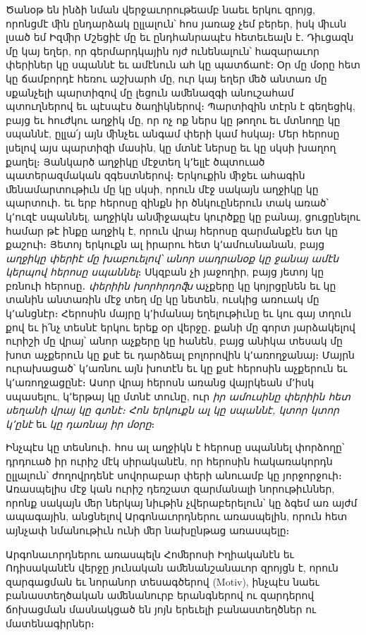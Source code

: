 \documentclass{article}
\begin{document}
{Ծանօթ են ինձի նման վերջաւորութեամբ նաեւ երկու զրոյց, որոնցմէ ﬕն ընդարձակ ըլլալուն՝ հոս յառաջ չեմ բերեր, իսկ ﬕւսն լսած եմ Իզﬕր Մշեցիէ մը եւ ընդհանրապէս հետեւեալն է․ Դիւցազն մը կայ եղեր, որ գերմարդկային ոյժ ունենալուն՝ հազարաւոր փերիներ կը սպաննէ եւ ամէնուն ահ կը պատճաոէ։ Օր մը մօրը հետ կը ճամբորդէ հեռու աշխարհ մը, ուր կայ եղեր ﬔծ անտառ մը սքանչելի պարտիզով մը լեցուն աﬔնազգի անուշահամ պտուղներով եւ պէսպէս ծաղիկներով։ Պարտիզին տէրն է գեղեցիկ, բայց եւ հուժկու աղջիկ մը, որ ոչ ոք ներս կը թողու եւ մտնողը կը սպաննէ, ըլլա՛յ այն ﬕնչեւ անգամ փերի կամ հսկայ։ Մեր հերոսը լսելով այս պարտիզի մասին, կը մտնէ ներսը եւ կը սկսի խաղող քաղել։ Յանկարծ աղջիկը մէջտեղ կ՚ելլէ ծպտուած պատերազմական զգեստներով։ Երկուքին ﬕջեւ ահագին ﬔնամարտութիւն մը կը սկսի, որուն մէջ սակայն աղջիկը կը պարտուի․ եւ երբ հերոսը զինքն իր ծնկուըներուն տակ առած՝ կ՚ուզէ սպաննել, աղջիկն անﬕջապէս կուրծքը կը բանայ, ցուցընելու համար թէ ինքը աղջիկ է, որուն վրայ հերոսը զարմանքէն ետ կը քաշուի։ Յետոյ երկուքն ալ իրարու հետ կ՚ամուսնանան, բայց \emph{աղջիկը փերիէ մը խաբուելով՝ անոր սադրանօք կը ջանայ ամէն կերպով հերոսը սպաննել}։ Սկզբան չի յաջողիր, բայց յետոյ կը բռնուի հերոսը․ \emph{փերիին խորհրդոﬖ} աչքերը կը կոյրցընեն եւ կը տանին անտառին մէջ տեղ մը կը նետեն, ուսկից առուակ մը կ՚անցնէր։ Հերոսին մայրը կ՚իմանայ եղելութիւնը եւ կու գայ տղուն քով եւ ի՛նչ տեսնէ երկու երեք օր վերջը․ քանի մը գորտ յարձակելով ուրիշի մը վրայ՝ անոր աչքերը կը հանեն, բայց անիկա տեսակ մը խոտ աչքերուն կը քսէ եւ դարձեալ բոլորովին կ՚առողջանայ։ Մայրն ուրախացած՝ կ՚առնու այն խոտէն եւ կը քսէ հերոսին աչքերուն եւ կ՚առողջացընէ։ Ասոր վրայ հերոսն առանց վայրկեան մ՚իսկ սպասելու, կ՚երթայ կը մտնէ տունը, ուր \emph{իր ամուսինը փերիին հետ սեղանի վրայ կը գտնէ։ Հոն երկուքն ալ կը սպաննէ, կտոր կտոր կ՚ընէ} եւ \emph{կը դառնայ իր մօրը}։

Ինչպէս կը տեսնուի․ հոս ալ աղջիկն է հերոսը սպաննել փորձողը՝ դրդուած իր ուրիշ մէկ սիրականէն, որ հերոսին հակառակորդն ըլլալուն՝ ժողովրդենէ սովորաբար փերի անուամբ կը յորջորջուի։ Առասպելիս մէջ կան ուրիշ դեռշատ զարմանալի նորութիւններ, որոնք սակայն ﬔր ներկայ նիւթին չվերաբերելուն՝ կը ձգեմ առ այժմ ապագային, անցնելով Արգոնաւորդներու առասպելին, որուն հետ այնչափ նմանութիւն ունի ﬔր նախընթաց առասպելը։

Արգոնաւորդներու առասպելն Հոﬔրոսի Իղիականէն եւ Ոդիսականէն վերջը յունական աﬔնանշանաւոր զրոյցն է, որուն զարգացման եւ նորանոր տեսագծերով (Motiv), ինչպէս նաեւ բանաստեղծական աﬔնանուրբ երանգներով ու զարդերով ճոխացման մասնակցած են յոյն երեւելի բանաստեղծներ ու մատենագիրներ։ 

}
\end{document}
